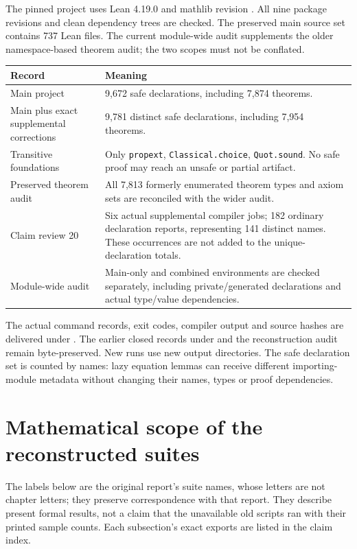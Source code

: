 The pinned project uses Lean 4.19.0 and mathlib revision
.
All nine package revisions and clean dependency trees are checked. The preserved main source set contains 737 Lean files. The current module-wide audit supplements the older namespace-based theorem audit; the two scopes must not be conflated.

\begin{longtable}{@{}p{}p{}@{}}
\toprule Record & Meaning\\\midrule\endhead
Main project & 9,672 safe declarations, including 7,874 theorems.\\
Main plus exact supplemental corrections & 9,781 distinct safe declarations, including 7,954 theorems.\\
Transitive foundations & Only \texttt{propext}, \texttt{Classical.choice}, \texttt{Quot.sound}. No safe proof may reach an unsafe or partial artifact.\\
Preserved theorem audit & All 7,813 formerly enumerated theorem types and axiom sets are reconciled with the wider audit.\\
Claim review 20 & Six actual supplemental compiler jobs; 182 ordinary declaration reports, representing 141 distinct names. These occurrences are not added to the unique-declaration totals.\\
Module-wide audit & Main-only and combined environments are checked separately, including private/generated declarations and actual type/value dependencies.\\
\bottomrule\end{longtable}

The actual command records, exit codes, compiler output and source hashes are delivered under . The earlier closed records under  and the reconstruction audit remain byte-preserved. New runs use new output directories. The safe declaration set is counted by names: lazy equation lemmas can receive different importing-module metadata without changing their names, types or proof dependencies.



\section{Mathematical scope of the reconstructed suites}\label{what-each-suite-actually-checks}

The labels below are the original report's suite names, whose letters are not chapter letters; they preserve correspondence with that report. They describe present formal results, not a claim that the unavailable old scripts ran with their printed sample counts. Each subsection's exact exports are listed in the claim index.

